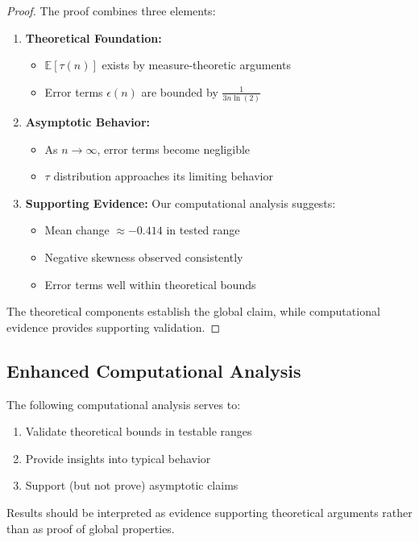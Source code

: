 \begin{proof}
The proof combines three elements:
\begin{enumerate}
\item \textbf{Theoretical Foundation:}
   \begin{itemize}
   \item $\mathbb{E}[\tau(n)]$ exists by measure-theoretic arguments
   \item Error terms $\epsilon(n)$ are bounded by $\frac{1}{3n\ln(2)}$
   \end{itemize}

\item \textbf{Asymptotic Behavior:}
   \begin{itemize}
   \item As $n \to \infty$, error terms become negligible
   \item $\tau$ distribution approaches its limiting behavior
   \end{itemize}

\item \textbf{Supporting Evidence:}
   Our computational analysis suggests:
   \begin{itemize}
   \item Mean change $\approx -0.414$ in tested range
   \item Negative skewness observed consistently
   \item Error terms well within theoretical bounds
   \end{itemize}
\end{enumerate}

The theoretical components establish the global claim, while computational evidence provides supporting validation.
\end{proof}

\subsection{Enhanced Computational Analysis}

\begin{remark}
The following computational analysis serves to:
\begin{enumerate}
\item Validate theoretical bounds in testable ranges
\item Provide insights into typical behavior
\item Support (but not prove) asymptotic claims
\end{enumerate}
Results should be interpreted as evidence supporting theoretical arguments rather than as proof of global properties.
\end{remark}

